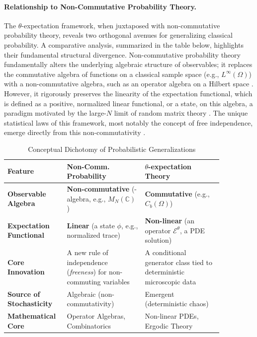 \documentclass[12pt, letterpaper]{amsart}
\newcommand{\ThetaExpectation}{$\theta$-expectation}
\theoremstyle{plain}
\theoremstyle{definition}
\theoremstyle{remark}
\begin{document}
\paragraph{\textbf{Relationship to Non-Commutative Probability Theory.}}
The \ThetaExpectation{} framework, when juxtaposed with non-commutative probability theory, reveals two orthogonal avenues for generalizing classical probability. A comparative analysis, summarized in the table below, highlights their fundamental structural divergence. Non-commutative probability theory fundamentally alters the underlying algebraic structure of observables; it replaces the commutative algebra of functions on a classical sample space (e.g., $L^\infty(\Omega)$) with a non-commutative algebra, such as an operator algebra on a Hilbert space \citep{BratteliRobinson1979}. However, it rigorously preserves the linearity of the expectation functional, which is defined as a positive, normalized linear functional, or a state, on this algebra, a paradigm motivated by the large-$N$ limit of random matrix theory \citep{Wigner1958}. The unique statistical laws of this framework, most notably the concept of free independence, emerge directly from this non-commutativity \citep{Voiculescu1991, NicaSpeicher2006}.


\begin{center}
\begin{table}[!ht]
\caption{Conceptual Dichotomy of Probabilistic Generalizations}
\label{tab:free_prob_comparison}
\renewcommand{\arraystretch}{1.4}
\begin{tabular}{L{0.20\linewidth}|L{0.33\linewidth}|L{0.33\linewidth}}
\hline \hline
\textbf{Feature} & \textbf{Non-Comm. Probability } & \textbf{\ThetaExpectation{} Theory} \\
\hline
\textbf{Observable Algebra} & \textbf{Non-commutative} (\*-algebra, e.g., $M_N(\mathbb{C})$) & \textbf{Commutative} (e.g., $C_b(\Omega)$) \\
\hline
\textbf{Expectation Functional} & \textbf{Linear} (a state $\phi$, e.g., normalized trace) & \textbf{Non-linear} (an operator $\mathcal{E}^\theta$, a PDE solution) \\
\hline
\textbf{Core Innovation} & A new rule of independence (\textit{freeness}) for non-commuting variables & A conditional generator class tied to deterministic microscopic data \\
\hline
\textbf{Source of Stochasticity} & Algebraic (non-commutativity) & Emergent (deterministic chaos) \\
\hline
\textbf{Mathematical Core} & Operator Algebras, Combinatorics & Non-linear PDEs, Ergodic Theory \\
\hline \hline
\end{tabular}
\renewcommand{\arraystretch}{1.0}
\end{table}
\end{center}
\end{document}
